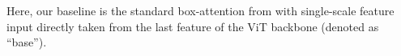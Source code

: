 






 Here, our baseline is the standard box-attention from \cite{nguyen2022boxer} with single-scale feature input directly taken from the last feature of the ViT backbone (denoted as ``base''). 

